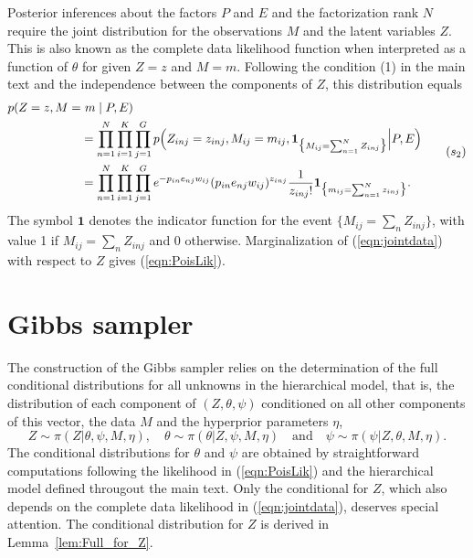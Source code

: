 \documentclass[11pt]{amsart}
\theoremstyle{definition}
\begin{document}
Posterior inferences about the factors $P$ and $E$ and the
factorization rank $N$ require the joint distribution for the
observations $M$ and the latent variables $Z$. This is also known as
the complete data likelihood function when interpreted as a function
of  $\theta$ for given $Z=z$ and $M=m$. Following the condition
(1) in the main text and the independence between
the components of $Z$, this distribution equals
\begin{equation}
   \label{eqn:jointdata}
 \begin{aligned}
    p(Z = z, M =&\ m \mid P, E) \notag\\
  &=
    \prod_{n=1}^N\prod_{i=1}^K\prod_{j=1}^G p\Big(Z_{inj} = z_{inj},
    M_{ij} = m_{ij}, \mathbf{1}_{\big\{M_{ij} = \sum_{n=1}^N
      Z_{inj}\big\}} \Big| P, E\Big)  \notag\\
  &=
    \prod_{n=1}^N\prod_{i=1}^K\prod_{j=1}^G e^{-p_{in}e_{nj}w_{ij}}
    (p_{in}e_{nj}w_{ij})^{z_{inj}} \frac{1}{z_{inj}!}
    \mathbf{1}_{\big\{m_{ij} = \sum_{n=1}^N z_{inj}\big\}}.
 \end{aligned}
 \tag{$s_2$}
\end{equation}
The symbol $\mathbf{1}$ denotes the indicator function for the
event $\big\{M_{ij} = \sum_n Z_{inj}\big\}$, with value 1 if $M_{ij} =
\sum_n  Z_{inj}$ and 0 otherwise. Marginalization of
(\ref{eqn:jointdata}) with respect to $Z$ gives  (\ref{eqn:PoisLik}).


\section{Gibbs sampler}
\label{sec:Gibbs}
The construction of the Gibbs sampler relies on the determination of
the full conditional distributions for all unknowns in the
hierarchical model, that is, the distribution of each component of
$(Z, \theta, \psi)$ conditioned on all other components of this vector,
the data $M$ and the hyperprior parameters $\eta$,
\[
   Z \sim \pi(Z|\theta, \psi, M, \eta), \quad
   \theta \sim \pi(\theta|Z, \psi, M, \eta) \quad
  \text{and}\quad
  \psi \sim \pi(\psi|Z, \theta, M, \eta).
\]
The conditional distributions for $\theta$ and $\psi$ are obtained by
straightforward computations following the likelihood in
(\ref{eqn:PoisLik}) and the hierarchical model defined througout the
main text. Only the conditional for $Z$, which also depends on the
complete data likelihood in (\ref{eqn:jointdata}), deserves special
attention. The conditional distribution for $Z$ is derived in
Lemma~\ref{lem:Full_for_Z}.
\end{document}
